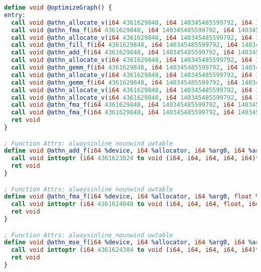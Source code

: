 \begin{lstlisting}[language=llvm,caption=Пример LLVM IR]
define void @optimizeGraph() {
entry:
  call void @athn_allocate_v(i64 4361629848, i64 140345485599792, i64 140345485573008)
  call void @athn_fma_f(i64 4361629848, i64 140345485599792, i64 140345485620352, float 2.000000e+00, i64 140345485611632, float -2.000000e+00, i64 140345485573008)
  call void @athn_allocate_v(i64 4361629848, i64 140345485599792, i64 140345485573088)
  call void @athn_fill_f(i64 4361629848, i64 140345485599792, i64 140345485573088, float 0.000000e+00)
  call void @athn_add_f(i64 4361629848, i64 140345485599792, i64 140345485573088, i64 140345485573008, i64 140345485573088)
  call void @athn_allocate_v(i64 4361629848, i64 140345485599792, i64 140345485612688)
  call void @athn_gemm_f(i64 4361629848, i64 140345485599792, i64 140345485592208, i64 140345485573088, i64 140345485616152, i64 140345485612688)
  call void @athn_allocate_v(i64 4361629848, i64 140345485599792, i64 140345485612736)
  call void @athn_gemm_f(i64 4361629848, i64 140345485599792, i64 140345485595808, i64 140345485613576, i64 140345485573088, i64 140345485612736)
  call void @athn_allocate_v(i64 4361629848, i64 140345485599792, i64 140345485573088)
  call void @athn_allocate_v(i64 4361629848, i64 140345485599792, i64 140345485573088)
  call void @athn_fma_f(i64 4361629848, i64 140345485599792, i64 140345485612736, float 0xBE7AD7F2A0000000, i64 140345485616152, float 1.000000e+00, i64 140345485616152)
  call void @athn_fma_f(i64 4361629848, i64 140345485599792, i64 140345485612688, float 0xBE7AD7F2A0000000, i64 140345485613576, float 1.000000e+00, i64 140345485613576)
  ret void
}

; Function Attrs: alwaysinline nounwind uwtable
define void @athn_add_f(i64 %device, i64 %allocator, i64 %arg0, i64 %arg1, i64 %arg2) #0 {
  call void inttoptr (i64 4361623824 to void (i64, i64, i64, i64, i64)*)(i64 %device, i64 %allocator, i64 %arg0, i64 %arg1, i64 %arg2)
  ret void
}

; Function Attrs: alwaysinline nounwind uwtable
define void @athn_fma_f(i64 %device, i64 %allocator, i64 %arg0, float %arg1, i64 %arg2, float %arg3, i64 %arg4) #0 {
  call void inttoptr (i64 4361624048 to void (i64, i64, i64, float, i64, float, i64)*)(i64 %device, i64 %allocator, i64 %arg0, float %arg1, i64 %arg2, float %arg3, i64 %arg4)
  ret void
}

; Function Attrs: alwaysinline nounwind uwtable
define void @athn_mse_f(i64 %device, i64 %allocator, i64 %arg0, i64 %arg1, i64 %arg2) #0 {
  call void inttoptr (i64 4361624304 to void (i64, i64, i64, i64, i64)*)(i64 %device, i64 %allocator, i64 %arg0, i64 %arg1, i64 %arg2)
  ret void
}


\end{lstlisting}
